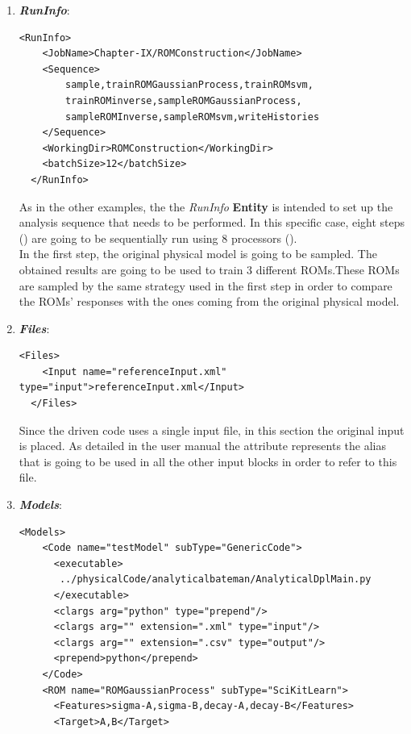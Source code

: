 \begin{enumerate}
   \item \textbf{\textit{RunInfo}}:
\begin{lstlisting}[style=XML,morekeywords={arg,extension,pauseAtEnd,overwrite}]
  <RunInfo>
    <JobName>Chapter-IX/ROMConstruction</JobName>
    <Sequence>
        sample,trainROMGaussianProcess,trainROMsvm,
        trainROMinverse,sampleROMGaussianProcess,
        sampleROMInverse,sampleROMsvm,writeHistories
    </Sequence>
    <WorkingDir>ROMConstruction</WorkingDir>
    <batchSize>12</batchSize>
  </RunInfo>
\end{lstlisting}
   As in the other examples, the the \textit{RunInfo} \textbf{Entity} is intended  to set up the analysis sequence that
   needs to be performed. In this specific case, eight steps  () are going to be sequentially run 
   using 8 processors (). 
   \\In the first step, the original physical model is going to be sampled. The obtained results are going to be used to
   train 3 different ROMs.These ROMs are sampled by the same strategy used in the first step in order to compare the
   ROMs' responses with the ones coming from the original physical model.
   \item \textbf{\textit{Files}}:
\begin{lstlisting}[style=XML,morekeywords={arg,extension,pauseAtEnd,overwrite}]
  <Files>
    <Input name="referenceInput.xml" type="input">referenceInput.xml</Input>
  </Files>
\end{lstlisting}
   Since the driven code uses a single input file, in this section the original input is placed. As detailed in the user manual
   the attribute   represents the alias that is going to be 
   used in all the other input blocks in order to refer to this file. 
   \item \textbf{\textit{Models}}:
\begin{lstlisting}[style=XML,morekeywords={arg,extension,pauseAtEnd,overwrite}]
  <Models>
    <Code name="testModel" subType="GenericCode">
      <executable>
       ../physicalCode/analyticalbateman/AnalyticalDplMain.py
      </executable>
      <clargs arg="python" type="prepend"/>
      <clargs arg="" extension=".xml" type="input"/>
      <clargs arg="" extension=".csv" type="output"/>
      <prepend>python</prepend>
    </Code>
    <ROM name="ROMGaussianProcess" subType="SciKitLearn">
      <Features>sigma-A,sigma-B,decay-A,decay-B</Features>
      <Target>A,B</Target>

\end{lstlisting}
\end{enumerate}
